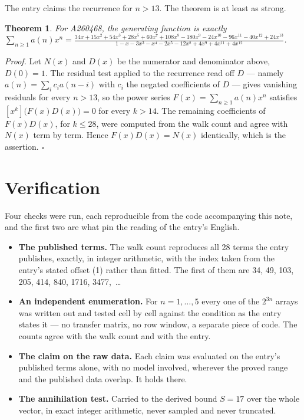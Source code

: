\documentclass[11pt]{article}
\newtheorem{theorem}{Theorem}
\theoremstyle{definition}
\begin{document}
The entry claims the recurrence for $n > 13$. The theorem is at least as strong.

\begin{theorem} For A260468, the generating function is exactly $\sum_{n\ge 1} a(n)x^n = \frac{34x + 15x^{2} + 54x^{3} + 28x^{5} + 60x^{7} + 108x^{8} - 180x^{9} - 24x^{10} - 96x^{11} - 40x^{12} + 24x^{13}}{1 - x - 3x^{3} - x^{4} - 2x^{5} - 12x^{8} + 4x^{9} + 4x^{11} + 4x^{12}}$.\end{theorem}

{\itshape Proof.} Let $N(x)$ and $D(x)$ be the numerator and denominator above, $D(0)=1$. The residual test applied to the recurrence read off $D$ --- namely $a(n) = \sum_i c_i a(n-i)$ with $c_i$ the negated coefficients of $D$ --- gives vanishing residuals for every $n > 13$, so the power series $F(x)=\sum_{n\ge 1}a(n)x^n$ satisfies $[x^k]\bigl(F(x)D(x)\bigr) = 0$ for every $k > 14$. The remaining coefficients of $F(x)D(x)$, for $k \le 28$, were computed from the walk count and agree with $N(x)$ term by term. Hence $F(x)D(x) = N(x)$ identically, which is the assertion. $\square$

\section{Verification}

Four checks were run, each reproducible from the code accompanying this note, and the first two are what pin the reading of the entry's English.

\begin{itemize}

\item {\bfseries The published terms.} The walk count reproduces all 28 terms the entry publishes, exactly, in integer arithmetic, with the index taken from the entry's stated offset (1) rather than fitted. The first of them are 34, 49, 103, 205, 414, 840, 1716, 3477,~\dots

\item {\bfseries An independent enumeration.} For $n = 1,\dots,5$ every one of the $2^{3n}$ arrays was written out and tested cell by cell against the condition as the entry states it --- no transfer matrix, no row window, a separate piece of code. The counts agree with the walk count and with the entry.

\item {\bfseries The claim on the raw data.} Each claim was evaluated on the entry's published terms alone, with no model involved, wherever the proved range and the published data overlap. It holds there.

\item {\bfseries The annihilation test.} Carried to the derived bound $S = 17$ over the whole vector, in exact integer arithmetic, never sampled and never truncated.

\end{itemize}
\end{document}
